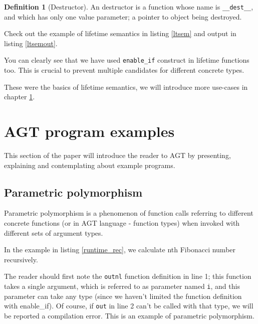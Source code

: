 \documentclass[times, utf8, diplomski]{fer}
\theoremstyle{definition}
\newtheorem{definition}{Definition}[]
\newcommand{\textcode}[3]{
    
}
\begin{document}
\begin{definition}[Destructor]
An destructor is a function whose name is \texttt{\_\_dest\_\_}, and which has only one value parameter;
a pointer to object being destroyed.
\end{definition}

Check out the example of lifetime semantics in listing \ref{ltsem} and output in listing \ref{ltsemout}.

\textcode{\resdir/compiler/lifetime_ex.agt}{ltsem}{Lifetime semantics}
\textcode{\resdir/compiler/lifetime_ex.out}{ltsemout}{Lifetime semantics - output}

You can clearly see that we have used \texttt{enable\_if} construct in lifetime functions too.
This is crucial to prevent multiple candidates for different concrete types.

These were the basics of lifetime semantics, we will introduce more use-cases
in chapter \ref{chap:examples}.




\chapter{AGT program examples}\label{chap:examples}

This section of the paper will introduce the reader to AGT by presenting, explaining and contemplating
about example programs.

\section{Parametric polymorphism}

Parametric polymorphism is a phenomenon of function calls referring to different concrete functions 
(or in AGT language - function types) when invoked with different sets of argument types.

In the example in listing \ref{runtime_rec}, we calculate nth Fibonacci number recursively.

\textcode{\resdir/programs/fib_runtime_recursion.agt}{runtime_rec}
{Fibonacci with recursion, Parametric Polymorphism}

The reader should first note the \texttt{outnl} function definition in line 1;
this function takes a single argument, which is referred to as parameter named \texttt{i},
and this parameter can take any type (since we haven't limited the function definition with enable\_if).
Of course, if \texttt{out} in line 2 can't be called with that type, we will be
reported a compilation error. This is an example of parametric polymorphism.
\end{document}
